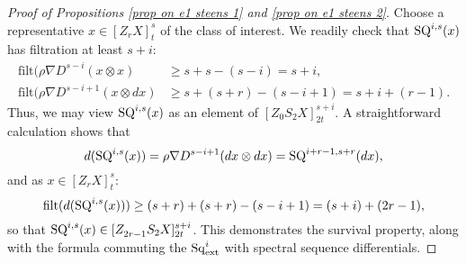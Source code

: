 \documentclass[11pt]{amsart} \renewcommand{\baselinestretch}{1.2}
\theoremstyle{plain}
\numberwithin{equation}{section} %
\theoremstyle{plain}
\numberwithin{equation}{chapter} %
\newcommand{\Nabla}{\nabla}
\newcommand{\Sq}{\mathrm{Sq}}
\newcommand{\E}[5]{[E^{#1}_{#2}#3]^{#4}_{#5}}
\newcommand{\EZdownup}[5]{[Z^{#2}_{#1}#3]^{#4}_{#5}}
\newcommand{\filt}{\mathrm{filt}}
\begin{document}
\begin{second quadrant homotopy sseq operations}
%
%
%
%
%


\begin{proof}[Proof of Propositions \ref{prop on e1 steens 1} and \ref{prop on e1 steens 2}]
Choose a representative $x\in \EZdownup{r}{}{X}{s}{t}$ of the class of interest. We readily check that $\textup{SQ}^{i,s}(x)$ has filtration at least $s+i$:
\begin{align*}
\filt(\rho\Nabla D^{s-i}(x\otimes x)&\geq s+s-(s-i)=s+i,\\
\filt(\rho\Nabla D^{s-i+1}(x\otimes dx)&\geq s+(s+r)-(s-i+1)=s+i+(r-1).
\end{align*}
Thus, we may view $\textup{SQ}^{i,s}(x)$ as an element of $\EZdownup{0}{}{S_2X}{s+i}{2t}$. 
A straightforward calculation shows that \[d(\textup{SQ}^{i,s}(x))=\rho\Nabla D^{s-i+1}(dx\otimes dx)=\textup{SQ}^{i+r-1,s+r}(dx),\] and as $x\in \EZdownup{r}{}{X}{s}{t}$:
\[\filt(d(\textup{SQ}^{i,s}(x)))\geq (s+r)+(s+r)-(s-i+1)=(s+i)+(2r-1),\]
so that $\textup{SQ}^{i,s}(x)\in \EZdownup{2r-1}{}{S_2X}{s+i}{2t}$. This demonstrates the survival property, along with the formula commuting the $\Sq^i_\textup{ext}$ with spectral sequence differentials.


\end{proof}
\end{second quadrant homotopy sseq operations}
\end{document}
